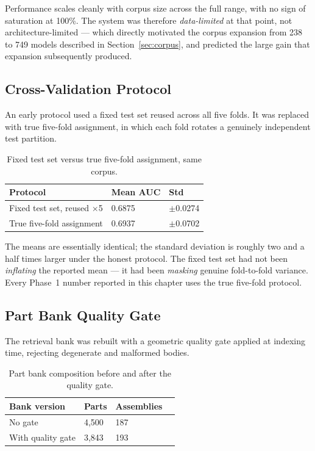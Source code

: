\documentclass[12pt,oneside,a4paper]{report}
\begin{document}
Performance scales cleanly with corpus size across the full range, with no sign
of saturation at 100\%. The system was therefore \emph{data-limited} at that
point, not architecture-limited --- which directly motivated the corpus
expansion from 238 to 749 models described in Section~\ref{sec:corpus}, and
predicted the large gain that expansion subsequently produced.

\subsection{Cross-Validation Protocol}

An early protocol used a fixed test set reused across all five folds. It was
replaced with true five-fold assignment, in which each fold rotates a genuinely
independent test partition.

\begin{table}[h]
\centering
\caption{Fixed test set versus true five-fold assignment, same corpus.}
\label{tab:cvprotocol}
\small
\begin{tabularx}{\textwidth}{@{}L{5.0cm}C{3.4cm}X@{}}
\toprule
\textbf{Protocol} & \textbf{Mean AUC} & \textbf{Std} \\
\midrule
Fixed test set, reused $\times$5 & 0.6875 & $\pm$0.0274 \\
True five-fold assignment & 0.6937 & $\pm$0.0702 \\
\bottomrule
\end{tabularx}
\end{table}

The means are essentially identical; the standard deviation is roughly two and
a half times larger under the honest protocol. The fixed test set had not been
\emph{inflating} the reported mean --- it had been \emph{masking} genuine
fold-to-fold variance. Every Phase~1 number reported in this chapter uses the
true five-fold protocol.

\subsection{Part Bank Quality Gate}

The retrieval bank was rebuilt with a geometric quality gate applied at
indexing time, rejecting degenerate and malformed bodies.

\begin{table}[h]
\centering
\caption{Part bank composition before and after the quality gate.}
\label{tab:partbank}
\small
\begin{tabularx}{\textwidth}{@{}L{4.6cm}C{3.0cm}C{3.0cm}X@{}}
\toprule
\textbf{Bank version} & \textbf{Parts} & \textbf{Assemblies} \\
\midrule
No gate & 4{,}500 & 187 \\
With quality gate & 3{,}843 & 193 \\
\bottomrule
\end{tabularx}
\end{table}
\end{document}
